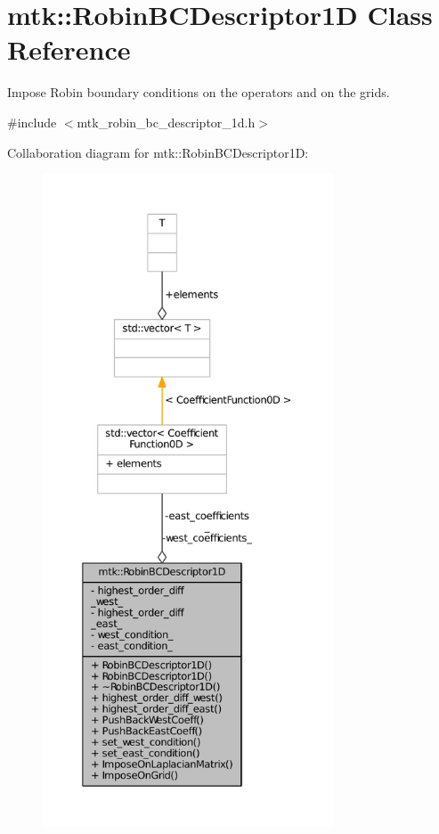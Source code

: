 \hypertarget{classmtk_1_1RobinBCDescriptor1D}{\section{mtk\+:\+:Robin\+B\+C\+Descriptor1\+D Class Reference}
\label{classmtk_1_1RobinBCDescriptor1D}
}


Impose Robin boundary conditions on the operators and on the grids.  




{\ttfamily \#include $<$mtk\+\_\+robin\+\_\+bc\+\_\+descriptor\+\_\+1d.\+h$>$}



Collaboration diagram for mtk\+:\+:Robin\+B\+C\+Descriptor1\+D\+:\nopagebreak
\begin{figure}[H]
\begin{center}
\leavevmode
\includegraphics[height=550pt]{classmtk_1_1RobinBCDescriptor1D__coll__graph}
\end{center}
\end{figure}
